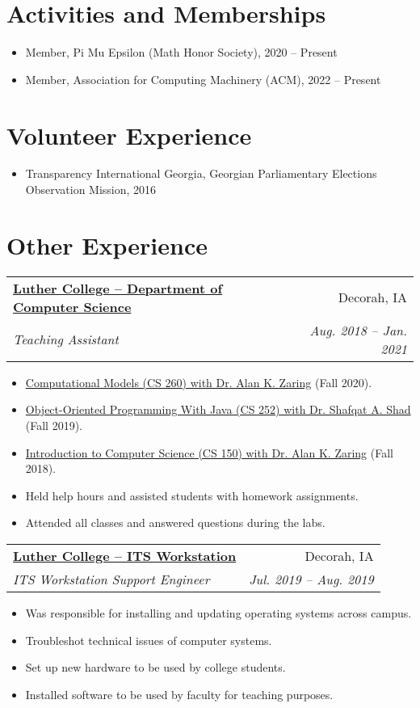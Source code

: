 \documentclass{article}
\makeatletter
\newcommand{\entry}[4]{
    \vspace{-1pt}
    \item
    \begin{tabular*}{0.98\textwidth}[t]{l@{\extracolsep{\fill}}r}
        \textbf{#1} & #2\\
        \textit{\small#3} & \textit{\small #4}\\
    \end{tabular*}\vspace{-4pt}
}
\newcommand{\entriesbegin}{\begin{itemize}[leftmargin=*]}
\newcommand{\entriesend}{\end{itemize}}
\newcommand{\entryitemsstart}{\begin{itemize}[label=\(\circ\)]}
\newcommand{\entryitemsend}{\end{itemize}\vspace{-4pt}}
\newcommand{\entryitem}[1]{\item\small{#1}}
\newcommand{\entrysubitem}[1]{\item[\(\circ\)]\small{#1}\vspace{-4pt}}
\makeatother
\begin{document}


\section{Activities and Memberships}

\entriesbegin
\entrysubitem{Member, Pi Mu Epsilon (Math Honor Society), 2020 -- Present}
\entrysubitem{Member, Association for Computing Machinery (ACM), 2022 -- Present}
\entriesend



\section{Volunteer Experience}

\entriesbegin
\entrysubitem{Transparency International Georgia, Georgian Parliamentary Elections Observation Mission, 2016}
\entriesend



\section{Other Experience}

\entry{\href{https://www.luther.edu/}{Luther College -- Department of Computer Science}}{Decorah, IA}{Teaching Assistant}{Aug. 2018 -- Jan. 2021}
\entryitemsstart
    \entryitem{\href{https://www.luther.edu/catalog/curriculum/computer-science/}{Computational Models (CS 260) with Dr. Alan K. Zaring} (Fall 2020).}
    \entryitem{\href{https://www.luther.edu/catalog/curriculum/computer-science/}{Object-Oriented Programming With Java (CS 252) with Dr. Shafqat A. Shad} (Fall 2019).}
    \entryitem{\href{https://www.luther.edu/catalog/curriculum/computer-science/}{Introduction to Computer Science (CS 150) with Dr. Alan K. Zaring} (Fall 2018).}
    \entryitem{Held help hours and assisted students with homework assignments.}
    \entryitem{Attended all classes and answered questions during the labs.}
\entryitemsend

\entry{\href{https://www.luther.edu/its/}{Luther College -- ITS Workstation}}{Decorah, IA}{ITS Workstation Support Engineer}{Jul. 2019 -- Aug. 2019}
\entryitemsstart
    \entryitem{Was responsible for installing and updating operating systems across campus.}
    \entryitem{Troubleshot technical issues of computer systems.}
    \entryitem{Set up new hardware to be used by college students.}
    \entryitem{Installed software to be used by faculty for teaching purposes.}
\entryitemsend
\end{document}
